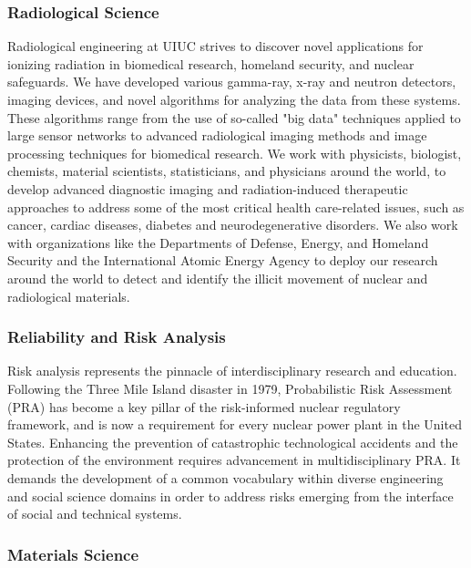 \documentclass[12pt, letterpaper]{article}
\begin{document}
\subsubsection{Radiological Science}
Radiological engineering at UIUC strives to discover novel applications for ionizing radiation in biomedical research, homeland security, and nuclear safeguards. We have developed various gamma-ray, x-ray and neutron detectors, imaging devices, and novel algorithms for analyzing the data from these systems. These algorithms range from the use of so-called "big data" techniques applied to large sensor networks to advanced radiological imaging methods and image processing techniques for biomedical research. We work with physicists, biologist, chemists, material scientists, statisticians, and physicians around the world, to develop advanced diagnostic imaging and radiation-induced therapeutic approaches to address some of the most critical health care-related issues, such as cancer, cardiac diseases, diabetes and neurodegenerative disorders. We also work with organizations like the Departments of Defense, Energy, and Homeland Security and the International Atomic Energy Agency to deploy our research around the world to detect and identify the illicit movement of nuclear and radiological materials.

\subsubsection{Reliability and Risk Analysis}
Risk analysis represents the pinnacle of interdisciplinary research and education. Following the Three Mile Island disaster in 1979, Probabilistic Risk Assessment (PRA) has become a key pillar of the risk-informed nuclear regulatory framework, and is now a requirement for every nuclear power plant in the United States. Enhancing the prevention of catastrophic technological accidents and the protection of the environment requires advancement in multidisciplinary PRA. It demands the development of a common vocabulary within diverse engineering and social science domains in order to address risks emerging from the interface of social and technical systems.


\subsubsection{Materials Science}
\end{document}
